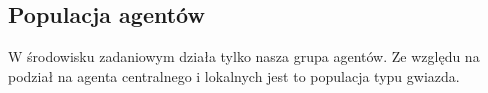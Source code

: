 
\subsection{Populacja agentów}
W środowisku zadaniowym działa tylko nasza grupa agentów. Ze względu na podział na agenta centralnego i lokalnych
jest to populacja typu gwiazda.

